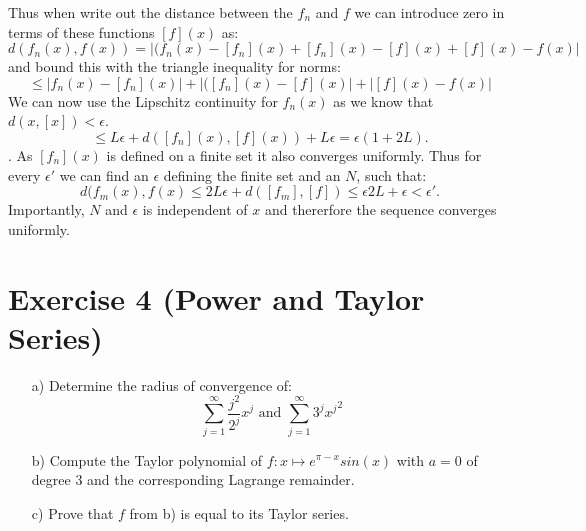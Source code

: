 \documentclass[10pt]{article}
\numberwithin{equation}{section}
\begin{document}
\begin{enumerate}
{		Thus when write out the distance between the $f_n$ and $f$ we can introduce zero in terms of these functions $[f](x)$ as:
		$$
		d(f_n(x), f(x)) = |(f_n(x) - [f_n](x) + [f_n](x) - [f](x) + [f](x) - f(x) |
		$$
	and bound this with the triangle inequality for norms:
		$$
		\leq |f_n(x) -  [f_n](x) | + |([f_n](x) - [f](x)| + |[f](x)- f(x)| 
		$$
		}
		We can now use the Lipschitz continuity for $f_n(x)$ as we know that $d(x, [x]) < \epsilon$.
		$$
		\leq L \epsilon + d([f_n](x), [f](x)) + L \epsilon = \epsilon (1 + 2 L ). 
		$$. 
		As $[f_n](x)$ is defined on a finite set it also converges uniformly. Thus for every $\epsilon'$ we can find an $\epsilon$ defining the finite set and an $N$, such that:
		$$	d(f_m(x), f(x) \leq 2 L \epsilon + d([f_m], [f]) \leq \epsilon 2L + \epsilon < \epsilon'. $$
		Importantly, $N$ and $\epsilon$ is independent of $x$ and thererfore the sequence converges uniformly. 

\end{enumerate}


\section*{Exercise 4 (Power and Taylor Series)}


\begin{enumerate}
\item[a)]{
    Determine the radius of convergence of:
    $$\sum_{j=1}^{\infty} \frac{j^2}{2^j}x^j \text{ and }\sum_{j=1}^{\infty} 3^j {x^j}^2$$
  }
\item[b)]{
    Compute the Taylor polynomial of $f: x \mapsto e^{\pi -x} sin(x)$ with $a=0$ of degree $3$ and the corresponding Lagrange remainder.
  }
\item[c)]{
    Prove that $f$ from b) is equal to its Taylor series.
  }
\end{enumerate}
\end{document}
